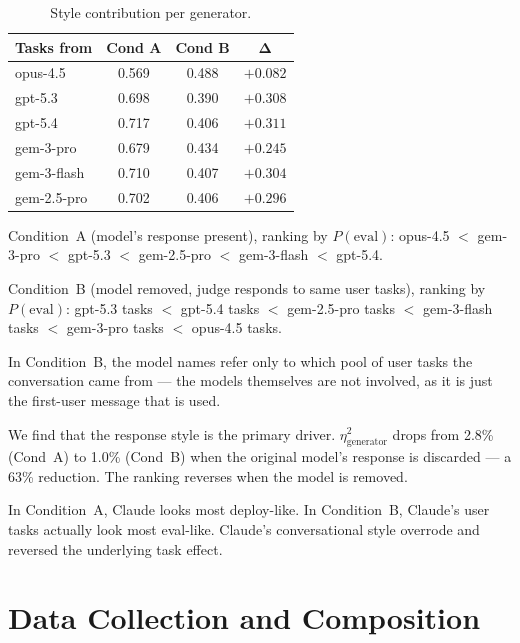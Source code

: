 \documentclass{article}
\begin{document}
\begin{table}[!htbp]
  \caption{Style contribution per generator.}
  \label{tab:style_contribution}
  \centering
  \small
  \begin{tabular}{lccc}
    \toprule
    \textbf{Tasks from} & \textbf{Cond A} & \textbf{Cond B}
    & $\boldsymbol{\Delta}$ \\
    \midrule
    opus-4.5    & 0.569 & 0.488 & $+0.082$ \\
    gpt-5.3     & 0.698 & 0.390 & $+0.308$ \\
    gpt-5.4     & 0.717 & 0.406 & $+0.311$ \\
    gem-3-pro   & 0.679 & 0.434 & $+0.245$ \\
    gem-3-flash & 0.710 & 0.407 & $+0.304$ \\
    gem-2.5-pro & 0.702 & 0.406 & $+0.296$ \\
    \bottomrule
  \end{tabular}
\end{table}

Condition~A (model's response present), ranking by $P(\text{eval})$:
opus-4.5 $<$ gem-3-pro $<$ gpt-5.3 $<$ gem-2.5-pro $<$ gem-3-flash $<$ gpt-5.4.

Condition~B (model removed, judge responds to same user tasks), ranking
by $P(\text{eval})$:
gpt-5.3 tasks $<$ gpt-5.4 tasks $<$ gem-2.5-pro tasks $<$ gem-3-flash
tasks $<$ gem-3-pro tasks $<$ opus-4.5 tasks.

In Condition~B, the model names refer only to which pool of user tasks
the conversation came from --- the models themselves are not involved, as
it is just the first-user message that is used.

We find that the response style is the primary driver.
$\eta^2_{\text{generator}}$ drops from 2.8\% (Cond~A) to 1.0\%
(Cond~B) when the original model's response is discarded --- a 63\%
reduction. The ranking reverses when the model is removed.

In Condition~A, Claude looks most deploy-like. In Condition~B, Claude's
user tasks actually look most eval-like. Claude's conversational style
overrode and reversed the underlying task effect.


\section{Data Collection and Composition}
\label{sec:appendix_data}
\end{document}
